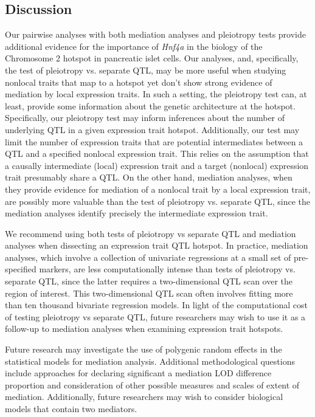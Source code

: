 \documentclass[oneside]{book}\usepackage[]{graphicx}\usepackage[]{color}
\begin{document}
\subsection{Discussion}

Our pairwise analyses with both mediation analyses and pleiotropy tests provide additional
evidence for the importance of \emph{Hnf4a} in the biology of the Chromosome 2 hotspot
in pancreatic islet cells. 
Our analyses, and, specifically, the test of pleiotropy vs. separate QTL, may be more useful
when studying nonlocal traits that map to a hotspot yet don't show strong evidence
of mediation by local expression traits. 
In such a setting, the pleiotropy test can, at least, provide some information about 
the genetic architecture at the hotspot. 
Specifically, our pleiotropy test may inform inferences about the number of 
underlying QTL in a given expression trait hotspot. 
Additionally, our test may limit the number of expression traits that are 
potential intermediates between a QTL and a specified nonlocal expression trait. 
This relies on the assumption that a causally intermediate (local) expression trait and a
target (nonlocal) expression trait presumably share a QTL. On the other hand, mediation analyses, when they provide evidence for mediation of a nonlocal
trait by a local expression trait, are possibly more valuable than the test of pleiotropy vs.
separate QTL, since the mediation analyses identify precisely the intermediate expression trait.

We recommend using both tests of pleiotropy vs separate QTL and mediation analyses when
dissecting an expression trait QTL hotspot. 
In practice, mediation analyses, which involve a collection of univariate regressions at a small
set of pre-specified markers, are less computationally intense than tests of pleiotropy vs.
separate QTL, since the latter requires a two-dimensional QTL scan over the region of interest.
This two-dimensional QTL scan often involves fitting more than ten thousand bivariate regression
models. In light of the computational cost of testing pleiotropy vs separate QTL, future
researchers may wish to use it as a follow-up to mediation analyses when examining expression
trait hotspots.

Future research may investigate the use of polygenic random effects in the statistical models
for mediation analysis. Additional methodological questions include approaches for declaring
significant a mediation LOD difference proportion and consideration of other possible measures
and scales of extent of mediation. Additionally, future researchers may wish to consider
biological models that contain two mediators.
\end{document}
